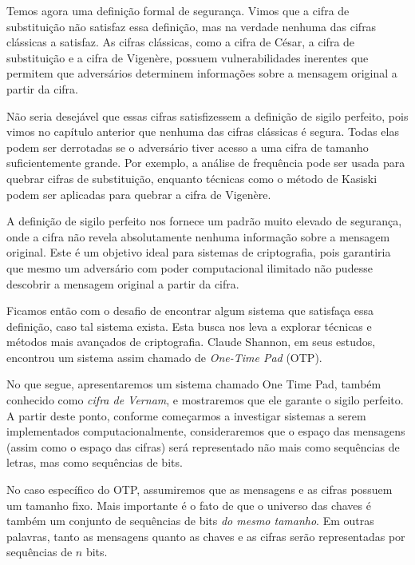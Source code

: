 Temos agora uma definição formal de segurança.
Vimos que a cifra de substituição não satisfaz essa definição, mas na verdade nenhuma das cifras clássicas a satisfaz.
As cifras clássicas, como a cifra de César, a cifra de substituição e a cifra de Vigenère, possuem vulnerabilidades inerentes que permitem que adversários determinem informações sobre a mensagem original a partir da cifra.

Não seria desejável que essas cifras satisfizessem a definição de sigilo perfeito, pois vimos no capítulo anterior que nenhuma das cifras clássicas é segura.
Todas elas podem ser derrotadas se o adversário tiver acesso a uma cifra de tamanho suficientemente grande.
Por exemplo, a análise de frequência pode ser usada para quebrar cifras de substituição, enquanto técnicas como o método de Kasiski podem ser aplicadas para quebrar a cifra de Vigenère.

A definição de sigilo perfeito nos fornece um padrão muito elevado de segurança, onde a cifra não revela absolutamente nenhuma informação sobre a mensagem original.
Este é um objetivo ideal para sistemas de criptografia, pois garantiria que mesmo um adversário com poder computacional ilimitado não pudesse descobrir a mensagem original a partir da cifra.

Ficamos então com o desafio de encontrar algum sistema que satisfaça essa definição, caso tal sistema exista.
Esta busca nos leva a explorar técnicas e métodos mais avançados de criptografia.
Claude Shannon, em seus estudos, encontrou um sistema assim chamado de {\em One-Time Pad} (OTP).

No que segue, apresentaremos um sistema chamado One Time Pad, também conhecido como {\em cifra de Vernam}, e mostraremos que ele garante o sigilo perfeito.
A partir deste ponto, conforme começarmos a investigar sistemas a serem implementados computacionalmente, consideraremos que o espaço das mensagens (assim como o espaço das cifras) será representado não mais como sequências de letras, mas como sequências de bits.

No caso específico do OTP, assumiremos que as mensagens e as cifras possuem um tamanho fixo.
Mais importante é o fato de que o universo das chaves é também um conjunto de sequências de bits {\em do mesmo tamanho}.
Em outras palavras, tanto as mensagens quanto as chaves e as cifras serão representadas por sequências de $n$ bits.

